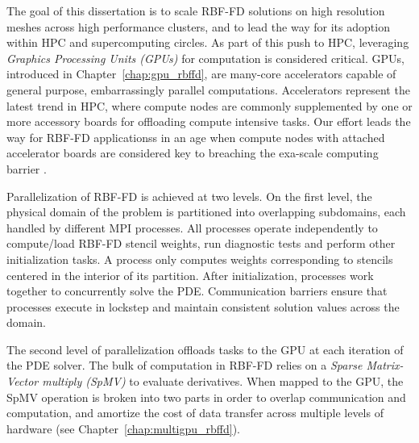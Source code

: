 \documentclass[11pt]{report}
\begin{document}
The goal of this dissertation is to scale RBF-FD solutions on high resolution meshes across high performance clusters, and to lead the way for its adoption within HPC and supercomputing circles. As part of this push to HPC, leveraging \emph{Graphics Processing Units (GPUs)} for computation is considered critical. GPUs, introduced in Chapter~\ref{chap:gpu_rbffd}, are many-core accelerators capable of general purpose, embarrassingly parallel computations. Accelerators represent the latest trend in HPC, where compute nodes are commonly supplemented by one or more accessory boards for offloading compute intensive tasks. Our effort leads the way for RBF-FD applicationss in an age when compute nodes with attached accelerator boards are considered key to breaching the exa-scale computing barrier \cite{GPUandExascale2011}. 


Parallelization of RBF-FD is achieved at two levels. On the first level, the
physical domain of the problem is partitioned
into overlapping subdomains, each handled by different MPI processes. All processes
operate independently to compute/load RBF-FD stencil weights, run diagnostic
tests and perform other initialization tasks. A process only computes weights
corresponding to stencils centered in the interior of its partition. After
initialization, processes work together to concurrently solve the PDE. Communication
barriers ensure that processes execute in lockstep and maintain consistent
solution values across the domain.  

The second level of
parallelization offloads tasks to the GPU at each iteration of the PDE solver. The bulk of computation in RBF-FD relies on a \emph{Sparse Matrix-Vector multiply (SpMV)} to evaluate derivatives. When mapped to the GPU, the SpMV operation is broken into two parts in order to overlap communication and computation, and amortize the cost of data transfer across multiple levels of hardware (see Chapter~\ref{chap:multigpu_rbffd}). 
\end{document}
